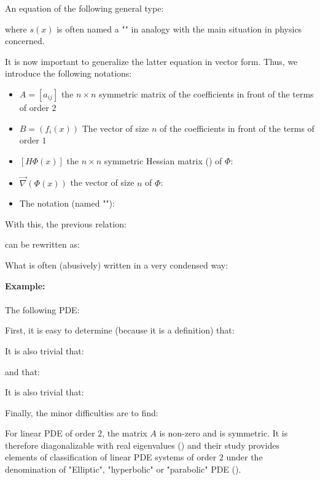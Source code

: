 	An equation of the following general type:
	
 	where $s(x)$ is often named a "" in analogy with the main situation in physics concerned.

	It is now important to generalize the latter equation in vector form. Thus, we introduce the following notations:
	\begin{itemize}
		\item $A=[a_{ij}]$ the $n\times n$ symmetric matrix of the coefficients in front of the terms of order $2$

		\item $B=(f_i(x))$ The vector of size $n$ of the coefficients in front of the terms of order $1$

		\item $[H\Phi(x)]$ the $n\times n$ symmetric Hessian matrix () of $\Phi$:
		

		\item $\vec{\nabla}(\Phi(x))$ the vector of size $n$ of $\Phi$:
		

		\item The notation (named ""):
		
	\end{itemize}
	With this, the previous relation:
	
	can be rewritten as:
	
	What is often (abusively) written in a very condensed way:
	
	\begin{tcolorbox}[colframe=black,colback=white,sharp corners]
	\textbf{{\Large {}}Example:}\\\\
	The following PDE:
	
	First, it is easy to determine (because it is a definition) that:
	
	It is also trivial that:
	
	and that:
	
	It is also trivial that:
	
	Finally, the minor difficulties are to find:
	
	\end{tcolorbox}
	For linear PDE of order $2$, the matrix $A$ is non-zero and is symmetric. It is therefore diagonalizable with real eigenvalues () and their study provides elements of classification of linear PDE systems of order $2$ under the denomination of "Elliptic", "hyperbolic" or "parabolic" PDE ().

